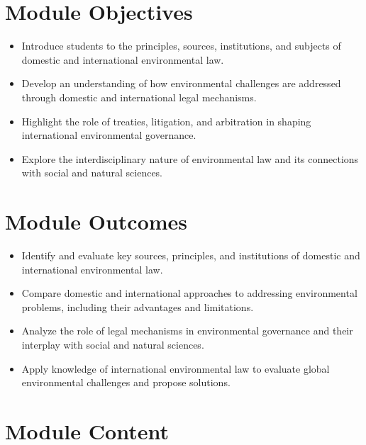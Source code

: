 \documentclass[
  letterpaper,
  10pt,
  openany]{book}
\providecommand{\tightlist}{%
  \setlength{\itemsep}{0pt}\setlength{\parskip}{0pt}}\usepackage{longtable,booktabs,array}
\begin{document}
\section*{Module Objectives}\label{module-objectives-1}


\begin{itemize}
\tightlist
\item
  Introduce students to the principles, sources, institutions, and
  subjects of domestic and international environmental law.
\item
  Develop an understanding of how environmental challenges are addressed
  through domestic and international legal mechanisms.
\item
  Highlight the role of treaties, litigation, and arbitration in shaping
  international environmental governance.
\item
  Explore the interdisciplinary nature of environmental law and its
  connections with social and natural sciences.
\end{itemize}

\section*{Module Outcomes}\label{module-outcomes-1}


\begin{itemize}
\tightlist
\item
  Identify and evaluate key sources, principles, and institutions of
  domestic and international environmental law.
\item
  Compare domestic and international approaches to addressing
  environmental problems, including their advantages and limitations.
\item
  Analyze the role of legal mechanisms in environmental governance and
  their interplay with social and natural sciences.
\item
  Apply knowledge of international environmental law to evaluate global
  environmental challenges and propose solutions.
\end{itemize}

\section*{Module Content}\label{module-content-2}
\end{document}

